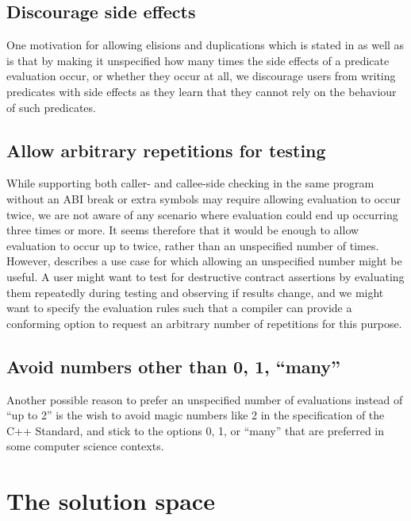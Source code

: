 \subsection{Discourage side effects}
\label{subsec:discourage}

One motivation for allowing elisions and duplications which is stated in \cite{P1670R0} as well as \cite{P2751R1} is that by making it unspecified how many times the side effects of a predicate evaluation occur, or whether they occur at all, we discourage users from writing predicates with side effects as they learn that they cannot rely on the behaviour of such predicates.

\subsection{Allow arbitrary repetitions for testing}
\label{subsec:rep}

While supporting both caller- and callee-side checking in the same program without an ABI break or extra symbols may require allowing evaluation to occur twice, we are not aware of any scenario where evaluation could end up occurring three times or more. It seems therefore that it would be enough to allow evaluation to occur up to twice, rather than an unspecified number of times. However,\cite{P3119R0} describes a use case for which allowing an unspecified number might be useful. A user might want to test for destructive contract assertions by evaluating them repeatedly during testing and observing if results change, and we might want to specify the evaluation rules such that a compiler can provide a conforming option to request an arbitrary number of repetitions for this purpose.

\subsection{Avoid numbers other than 0, 1, ``many''}
\label{subsec:01many}

Another possible reason to prefer an unspecified number of evaluations instead of ``up to 2'' is the wish to avoid magic numbers like 2 in the specification of the C++ Standard, and stick to the options 0, 1, or ``many'' that are preferred in some computer science contexts.


\section{The solution space}
\label{sec:prepost}

